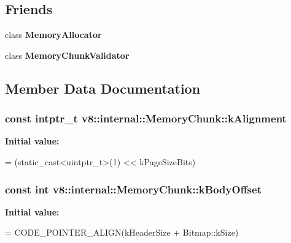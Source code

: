 \subsection*{Friends}
\begin{DoxyCompactItemize}
\item 
class {\bfseries Memory\+Allocator}\hypertarget{classv8_1_1internal_1_1_memory_chunk_aea1126d5a764b0d074d2d6edb5a09f23}{}\label{classv8_1_1internal_1_1_memory_chunk_aea1126d5a764b0d074d2d6edb5a09f23}

\item 
class {\bfseries Memory\+Chunk\+Validator}\hypertarget{classv8_1_1internal_1_1_memory_chunk_a678cb99f13bd8a3b1e597d1639015012}{}\label{classv8_1_1internal_1_1_memory_chunk_a678cb99f13bd8a3b1e597d1639015012}

\end{DoxyCompactItemize}


\subsection{Member Data Documentation}
\subsubsection[{\texorpdfstring{k\+Alignment}{kAlignment}}]{\setlength{\rightskip}{0pt plus 5cm}const intptr\+\_\+t v8\+::internal\+::\+Memory\+Chunk\+::k\+Alignment\hspace{0.3cm}{\ttfamily [static]}}\hypertarget{classv8_1_1internal_1_1_memory_chunk_aeb9f7807568ebb3077c7d89921fcfee2}{}\label{classv8_1_1internal_1_1_memory_chunk_aeb9f7807568ebb3077c7d89921fcfee2}
{\bfseries Initial value\+:}
\begin{DoxyCode}
=
      (\textcolor{keyword}{static\_cast<}uintptr\_t\textcolor{keyword}{>}(1) << kPageSizeBits)
\end{DoxyCode}
\subsubsection[{\texorpdfstring{k\+Body\+Offset}{kBodyOffset}}]{\setlength{\rightskip}{0pt plus 5cm}const int v8\+::internal\+::\+Memory\+Chunk\+::k\+Body\+Offset\hspace{0.3cm}{\ttfamily [static]}}\hypertarget{classv8_1_1internal_1_1_memory_chunk_a7529c94094cfc0789acd79a2e439c6dd}{}\label{classv8_1_1internal_1_1_memory_chunk_a7529c94094cfc0789acd79a2e439c6dd}
{\bfseries Initial value\+:}
\begin{DoxyCode}
=
      CODE\_POINTER\_ALIGN(kHeaderSize + Bitmap::kSize)
\end{DoxyCode}
